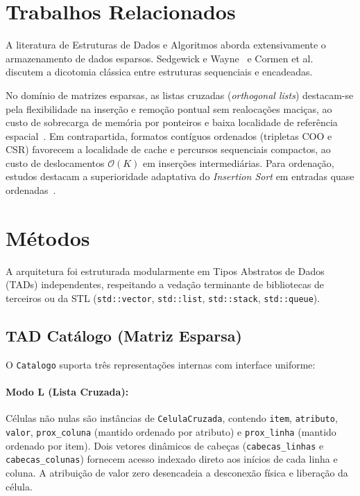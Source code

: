\documentclass[letterpaper]{article}
\begin{document}
\section{Trabalhos Relacionados}
A literatura de Estruturas de Dados e Algoritmos aborda extensivamente o armazenamento de dados esparsos. Sedgewick e Wayne~\cite{sedgewick2011} e Cormen et al.~\cite{cormen2022} discutem a dicotomia clássica entre estruturas sequenciais e encadeadas.

No domínio de matrizes esparsas, as listas cruzadas (\textit{orthogonal lists}) destacam-se pela flexibilidade na inserção e remoção pontual sem realocações maciças, ao custo de sobrecarga de memória por ponteiros e baixa localidade de referência espacial~\cite{knuth1997}. Em contrapartida, formatos contíguos ordenados (tripletas COO e CSR) favorecem a localidade de cache e percursos sequenciais compactos, ao custo de deslocamentos $\mathcal{O}(K)$ em inserções intermediárias. Para ordenação, estudos destacam a superioridade adaptativa do \textit{Insertion Sort} em entradas quase ordenadas~\cite{cormen2022}.

\section{Métodos}
A arquitetura foi estruturada modularmente em Tipos Abstratos de Dados (TADs) independentes, respeitando a vedação terminante de bibliotecas de terceiros ou da STL (\texttt{std::vector}, \texttt{std::list}, \texttt{std::stack}, \texttt{std::queue}).

\subsection{TAD Catálogo (Matriz Esparsa)}
O \texttt{Catalogo} suporta três representações internas com interface uniforme:

\paragraph{Modo L (Lista Cruzada):} Células não nulas são instâncias de \texttt{CelulaCruzada}, contendo \texttt{item}, \texttt{atributo}, \texttt{valor}, \texttt{prox\_coluna} (mantido ordenado por atributo) e \texttt{prox\_linha} (mantido ordenado por item). Dois vetores dinâmicos de cabeças (\texttt{cabecas\_linhas} e \texttt{cabecas\_colunas}) fornecem acesso indexado direto aos inícios de cada linha e coluna. A atribuição de valor zero desencadeia a desconexão física e liberação da célula.
\end{document}
